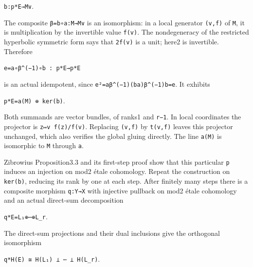 \documentclass[
  10pt,
]{article}
\begin{document}
\texttt{\small b:\allowbreak{}p*E→\allowbreak{}M∨}.

The composite
\texttt{\small β=\allowbreak{}b∘a:\allowbreak{}M→\allowbreak{}M∨} is an
isomorphism: in a local generator
\texttt{\small (\allowbreak{}v,\allowbreak{}f)\allowbreak{}} of
\texttt{\small M}, it is multiplication by the invertible value
\texttt{\small f(\allowbreak{}v)\allowbreak{}}. The nondegeneracy of the
restricted hyperbolic symmetric form says that
\texttt{\small 2f(\allowbreak{}v)\allowbreak{}} is a unit; here2 is
invertible. Therefore

\texttt{\small e=\allowbreak{}a∘β\textasciicircum{}(\allowbreak{}−1)\allowbreak{}∘b :\allowbreak{} p*E→\allowbreak{}p*E}

is an actual idempotent, since
\texttt{\small e²=\allowbreak{}aβ\textasciicircum{}(\allowbreak{}−1)\allowbreak{}(\allowbreak{}ba)\allowbreak{}β\textasciicircum{}(\allowbreak{}−1)\allowbreak{}b=\allowbreak{}e}.
It exhibits

\texttt{\small p*E=\allowbreak{}a(\allowbreak{}M)\allowbreak{} ⊕\allowbreak{} ker(\allowbreak{}b)\allowbreak{}}.

Both summands are vector bundles, of ranks1 and \texttt{\small r−1}. In
local coordinates the projector is
\texttt{\small z↦v f(\allowbreak{}z)\allowbreak{}/\allowbreak{}f(\allowbreak{}v)\allowbreak{}}.
Replacing \texttt{\small (\allowbreak{}v,\allowbreak{}f)\allowbreak{}}
by \texttt{\small t(\allowbreak{}v,\allowbreak{}f)\allowbreak{}} leaves
this projector unchanged, which also verifies the global gluing
directly. The line \texttt{\small a(\allowbreak{}M)\allowbreak{}} is
isomorphic to \texttt{\small M} through \texttt{\small a}.

Zibrowius Proposition3.3 and its first-step proof show that this
particular \texttt{\small p} induces an injection on mod2 étale
cohomology. Repeat the construction on
\texttt{\small ker(\allowbreak{}b)\allowbreak{}}, reducing its rank by
one at each step. After finitely many steps there is a composite
morphism \texttt{\small q:\allowbreak{}Y→\allowbreak{}X} with injective
pullback on mod2 étale cohomology and an actual direct-sum decomposition

\texttt{\small q*E=\allowbreak{}L₁⊕\allowbreak{}⋯⊕\allowbreak{}L\_\allowbreak{}r}.

The direct-sum projections and their dual inclusions give the orthogonal
isomorphism

\texttt{\small q*H(\allowbreak{}E)\allowbreak{} ≅ H(\allowbreak{}L₁)\allowbreak{} ⊥ ⋯ ⊥ H(\allowbreak{}L\_\allowbreak{}r)\allowbreak{}}.
\end{document}
